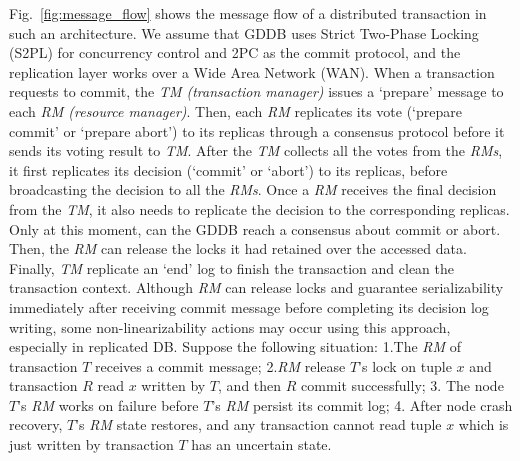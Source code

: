 \documentclass[conference]{IEEEtran}
\begin{document}
Fig.~\ref{fig:message_flow} shows the message flow of a distributed transaction in such an architecture. We assume that
GDDB uses Strict Two-Phase Locking (S2PL) for concurrency control and 2PC as the commit protocol, and the replication layer works over a Wide Area Network (WAN).
When a transaction requests to commit, the \emph{TM (transaction manager)} issues a `prepare' message to each \emph{RM (resource manager)}.
Then, each \emph{RM} replicates its vote (`prepare commit' or `prepare abort') to its replicas through a consensus protocol before it
sends its voting result to \emph{TM}.
After the \emph{TM} collects all the votes from the \emph{RMs}, it first replicates its decision (`commit' or `abort') to its replicas, before broadcasting the decision to all the \emph{RMs}.
Once a \emph{RM} receives the final decision from the \emph{TM}, it also needs to replicate the decision to the corresponding replicas.
Only at this moment, can the GDDB reach a consensus about commit or abort.
Then, the \emph{RM} can release the locks it had retained over the accessed data.
Finally, \emph{TM} replicate an `end' log to finish the transaction and clean the transaction context.
Although \emph{RM} can release locks and guarantee serializability immediately after receiving commit message before completing its decision log writing, some non-linearizability actions may occur using this approach, especially in replicated DB.
Suppose the following situation:
1.The \emph{RM} of transaction ${T}$ receives a commit message;
2.\emph{RM} release ${T}$'s lock on tuple ${x}$
and transaction ${R}$ read ${x}$ written by ${T}$,
and then ${R}$ commit successfully;
3. The node ${T}$'s \emph{RM} works on failure before ${T}$'s \emph{RM} persist its commit log; 
4. After node crash recovery, ${T}$'s \emph{RM} state restores, and any transaction cannot read tuple ${x}$ which is just written by transaction ${T}$ has an uncertain state.



\begin{table}[tbp]
  \centering
  \caption{network message RTT on Alibaba ECS}

\label{tbl:network_rtt}
\end{table}
\end{document}
